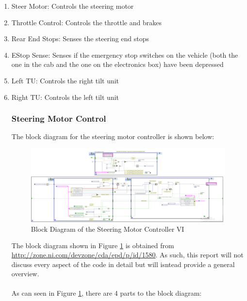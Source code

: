 \begin{enumerate}
\item Steer Motor: Controls the steering motor
\item Throttle Control: Controls the throttle and brakes
\item Rear End Stops: Senses the steering end stops
\item EStop Sense: Senses if the emergency stop switches on the vehicle (both the one in the cab and the one on the electronics box) have been depressed
\item Left TU: Controls the right tilt unit
\item Right TU: Controls the left tilt unit

\subsubsection{Steering Motor Control}

The block diagram for the steering motor controller is shown below:
\begin{figure}[h!]
\centering
\includegraphics[scale=2.0]{Photos/steermotorblock.png}
\caption{Block Diagram of the Steering Motor Controller VI}
\label{fig:steermotorblock}
\end{figure}

\noindent The block diagram shown in Figure \ref{fig:steermotorblock} is obtained from \url{http://zone.ni.com/devzone/cda/epd/p/id/1580}. As such, this report will not discuss every aspect of the code in detail but will isntead provide a general overview. \\ \\
%
As can seen in Figure \ref{fig:steermotorblock}, there are 4 parts to the block diagram:


\end{enumerate}
